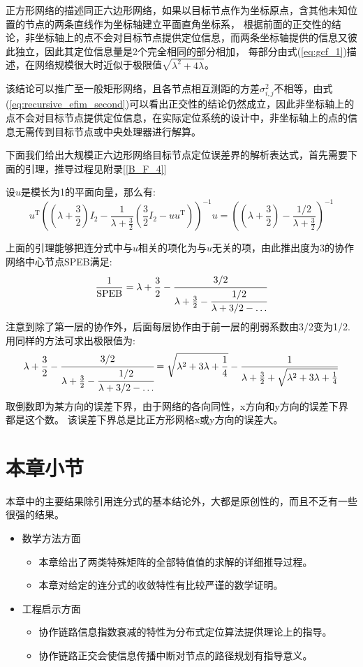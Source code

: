 正方形网络的描述同正六边形网络，如果以目标节点作为坐标原点，含其他未知位置的节点的两条直线作为坐标轴建立平面直角坐标系，
根据前面的正交性的结论，非坐标轴上的点不会对目标节点提供定位信息，而两条坐标轴提供的信息又彼此独立，因此其定位信息量是2个完全相同的部分相加，
每部分由式(\ref{eq:gcf_1})描述，在网络规模很大时近似于极限值$\sqrt{\lambda^2+4\lambda}$。

该结论可以推广至一般矩形网络，且各节点相互测距的方差$\sigma^2_{i,j}$不相等，由式(\ref{eq:recursive_efim_second})可以看出正交性的结论仍然成立，因此非坐标轴上的点不会对目标节点提供定位信息，在实际定位系统的设计中，非坐标轴上的点的信息无需传到目标节点或中央处理器进行解算。

下面我们给出大规模正六边形网络目标节点定位误差界的解析表达式，首先需要下面的引理，推导过程见附录[\ref{B_F_4}]
\begin{lemma}\label{lemma:hexagon}
  设$u$是模长为1的平面向量，那么有:
\begin{equation}\label{eq:equiv}
  u^{\textrm{T}} ((\lambda+\frac{3}{2})I_2-\frac{1}{\lambda+\frac{3}{2}}(\frac{3}{2}I_2-uu^{\textrm{T}} ))^{-1}u
  =((\lambda+\frac{3}{2})-\frac{1/2}{\lambda+\frac{3}{2}})^{-1}
\end{equation}
\end{lemma}
  上面的引理能够把连分式中与$u$相关的项化为与$u$无关的项，由此推出度为3的协作网络中心节点SPEB满足:
  \[
\frac{1}{\text{SPEB}}=\lambda+\frac{3}{2}-\cfrac{3/2}{\lambda+\frac{3}{2}-\cfrac{1/2}{\lambda+3/2-\dots}}
  \]
  注意到除了第一层的协作外，后面每层协作由于前一层的削弱系数由3/2变为1/2.
  用同样的方法可求出极限值为:
  \[
  \lambda+\frac{3}{2}-\cfrac{3/2}{\lambda+\frac{3}{2}-\cfrac{1/2}{\lambda+3/2-\dots}}=\sqrt{\lambda^2+3\lambda+\frac{1}{4}}-\frac{1}{\lambda+\frac{3}{2}+\sqrt{\lambda^2+3\lambda+\frac{1}{4}}}
  \]
  取倒数即为某方向的误差下界，由于网络的各向同性，x方向和y方向的误差下界都是这个数。
该误差下界总是比正方形网格x或y方向的误差大。

\section{本章小节}\label{section:conclusion4}
   本章中的主要结果除引用连分式的基本结论外，大都是原创性的，而且不乏有一些很强的结果。
  \begin{itemize}
  \item
  数学方法方面
  \begin{itemize}
  \item 本章给出了两类特殊矩阵的全部特值值的求解的详细推导过程。
  \item 本章对给定的连分式的收敛特性有比较严谨的数学证明。
  \end{itemize}
  \item
  工程启示方面
  \begin{itemize}
  \item
    协作链路信息指数衰减的特性为分布式定位算法提供理论上的指导。
  \item
    协作链路正交会使信息传播中断对节点的路径规划有指导意义。
  \end{itemize}
  \end{itemize}
